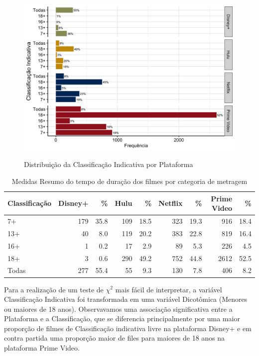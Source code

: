 \documentclass[a4paper, 12pt]{article} %
\begin{document}
\begin{figure}[H]
    \centering
    \caption{Distribuição da Classificação Indicativa por Plataforma}
    \includegraphics[scale=0.25]{Fig_Classificacao_Plataforma.png}
    \label{fig:my_label}
\end{figure}


\begin{table}[H]
\caption{Medidas Resumo do tempo de duração dos filmes por categoria de metragem}
\centering
\begin{tabular}{l|rrrrrrrr}
\hline
\multicolumn{1}{l|}{\textbf{Classificação}} &
\multicolumn{1}{r}{\textbf{Disney+}} &
\multicolumn{1}{r}{\textbf{\%}} &
\multicolumn{1}{r}{\textbf{Hulu}}&
\multicolumn{1}{r}{\textbf{\%}}&
\multicolumn{1}{r}{\textbf{Netflix}}&
\multicolumn{1}{r}{\textbf{\%}}&
\multicolumn{1}{r}{\textbf{Prime Video}}&
\multicolumn{1}{r}{\textbf{\%}}\\
\hline

 7+ & 179 & 35.8 & 109 & 18.5 & 323 & 19.3 & 916 & 18.4 \\
 13+ &  40 & 8.0 & 119 & 20.2 & 383 & 22.8 & 819 & 16.4 \\
 16+ & 1 & 0.2 & 17 & 2.9 & 89 & 5.3 & 226 & 4.5  \\
 18+ & 3 & 0.6 & 290 & 49.2 & 752 & 44.8 & 2612 & 52.5   \\
Todas &  277 & 55.4 &  55 & 9.3 &  130 & 7.8 &  406 & 8.2  \\
\hline
\end{tabular}
\end{table}

Para a realização de um teste de $\chi^2$ mais fácil de interpretar, a variável Classificação Indicativa foi transformada em uma variável Dicotômica (Menores ou maiores de 18 anos). Observavamos uma associação significativa entre a Plataforma e a Classificação, que se diferencia principalmente por uma maior proporção de filmes de Classificação indicativa livre na plataforma Disney+ e em contra partida uma proporção maior de files para maiores de 18 anos na plataforma Prime Video.
\end{document}

